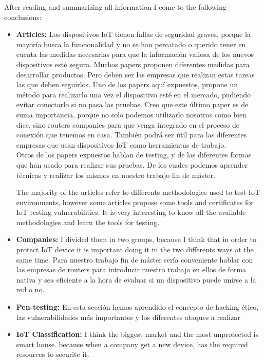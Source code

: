 
After reading and summarizing all information I come to the following conclusions:

\begin{itemize}
	\item \textbf{Articles:} 
	Los dispositivos IoT tienen fallas de seguridad graves, porque la mayoría busca la funcionalidad y no se han percatado o querido tener en cuenta las medidas necesarias para que la información valiosa de los nuevos dispositivos esté segura. Muchos papers proponen diferentes medidas para desarrollar productos. Pero deben ser las empresas que realizan estas tareas las que deben seguirlos. Uno de los papers aquí expuestos, propone un método para realizarlo una vez el dispositivo esté en el mercado, pudiendo evitar conectarlo si no pasa las pruebas. Creo que este último paper es de suma importancia, porque no solo podemos utilizarlo nosotros como bien dice, sino routers companies para que venga integrado en el proceso de conexión que tenemos en casa. También podrá ser útil para las diferentes empresas que usan dispositivos IoT como herramientas de trabajo.\\
	Otros de los papers expuestos hablan de testing, y de las diferentes formas que han usado para realizar sus pruebas. De los cuales podemos aprender técnicas y realizar los mismos en nuestro trabajo fin de máster.
	
	The majority of the articles refer to differents methodologies used to test IoT environments, however some articles propose some tools and certificates for IoT testing vulnerabilities. It is very interesting to know all the available methodologies and learn the tools for testing.
	
	\item \textbf{Companies:} I divided them in two groups, because I think that in order to protect IoT device it is important doing it in the two differents ways at the same time. Para nuestro trabajo fin de máster sería conveniente hablar con las empresas de routers para introducir nuestro trabajo en ellos de forma nativa y sea eficiente a la hora de evaluar si un dispositivo puede unirse a la red o no.

	\item \textbf{Pen-testing:} En esta sección hemos aprendido el concepto de hacking ético, las vulnerabilidades más importantes y los diferentes ataques a realizar
	
	\item \textbf{IoT Classification:} I think the biggest market and the most unprotected is smart house. because when a company get a new device, has the required resources to securite it.
\end{itemize}